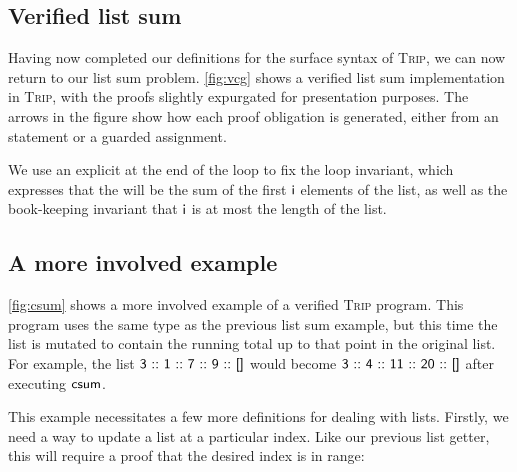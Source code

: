 \documentclass[sigplan]{acmart}%
\begin{document}
\subsection{Verified list sum}
Having now completed our definitions for the surface syntax of \textsc{Trip}, we 
can now return to our list sum problem. \autoref{fig:vcg} shows a verified 
list sum implementation in \textsc{Trip}, with the proofs slightly expurgated 
for presentation purposes. The arrows in the figure show how each proof 
obligation is generated, either from an  statement or 
a guarded assignment. 

We use an explicit  at the end of the loop to fix the 
loop invariant, which expresses that the  will be the sum 
of the first $\AgdaField{i}$ elements of the list, as well as the book-keeping 
invariant that $\AgdaField{i}$ is at most the length of the list.

\subsection{A more involved example}
\autoref{fig:csum} shows a more involved example of a verified \textsc{Trip} program.
This program uses the same  type as the previous list sum example,
but this time the list is mutated to contain the running total up to that point in the original list.
For example, the list
$ \AgdaNumber{3}\ \AgdaInductiveConstructor{::}\ \AgdaNumber{1}\ \AgdaInductiveConstructor{::}\ \AgdaNumber{7}\ \AgdaInductiveConstructor{::}\ \AgdaNumber{9}\ \AgdaInductiveConstructor{::}\ \AgdaInductiveConstructor{[]} $
would become
$ \AgdaNumber{3}\ \AgdaInductiveConstructor{::}\ \AgdaNumber{4}\ \AgdaInductiveConstructor{::}\ \AgdaNumber{11}\ \AgdaInductiveConstructor{::}\ \AgdaNumber{20}\ \AgdaInductiveConstructor{::}\ \AgdaInductiveConstructor{[]} $
after executing $\AgdaFunction{csum}$.

This example necessitates a few more definitions for dealing with lists. Firstly, we need 
a way to update a list at a particular index. Like our previous list getter, this will require 
a proof that the desired index is in range:
\end{document}
